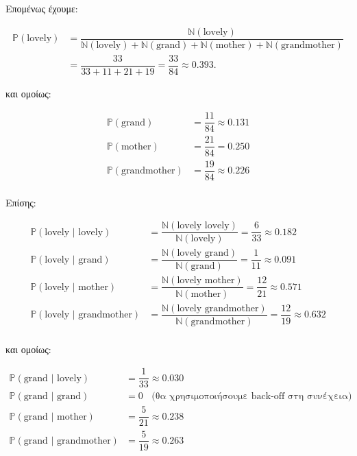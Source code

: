 \documentclass[12pt,a4paper]{article}
\begin{document}
			Επομένως έχουμε:
			
			\begin{align*}
				\mathbb{P}(\text{lovely}) &= \dfrac{\mathbb{N}(\text{lovely})}{\mathbb{N}(\text{lovely}) + \mathbb{N}(\text{grand}) + \mathbb{N}(\text{mother}) + \mathbb{N}(\text{grandmother})} \\ 
				&= \dfrac{33}{33+11+21+19} = \dfrac{33}{84} \approx 0.393.
			\end{align*}
			
			και ομοίως:
			
			\begin{align*}
				\mathbb{P}(\text{grand}) &= \dfrac{11}{84} \approx 0.131\\
				\mathbb{P}(\text{mother}) &= \dfrac{21}{84} = 0.250\\
				\mathbb{P}(\text{grandmother}) &= \dfrac{19}{84} \approx 0.226 \\
			\end{align*}
			
			Επίσης:
			
			\begin{align*}
				\mathbb{P}(\text{lovely | lovely}) &= \dfrac{\mathbb{N}(\text{lovely lovely})}{\mathbb{N}(\text{lovely})} = \dfrac{6}{33} \approx 0.182 \\
				\mathbb{P}(\text{lovely | grand}) &= \dfrac{\mathbb{N}(\text{lovely grand})}{\mathbb{N}(\text{grand})} = \dfrac{1}{11} \approx 0.091 \\
				\mathbb{P}(\text{lovely | mother}) &= \dfrac{\mathbb{N}(\text{lovely mother})}{\mathbb{N}(\text{mother})} = \dfrac{12}{21} \approx 0.571 \\
				\mathbb{P}(\text{lovely | grandmother}) &= \dfrac{\mathbb{N}(\text{lovely grandmother})}{\mathbb{N}(\text{grandmother})} = \dfrac{12}{19} \approx 0.632 \\
			\end{align*}
			
			και ομοίως:
			
			\begin{align*}
				\mathbb{P}(\text{grand | lovely}) &= \dfrac{1}{33} \approx 0.030 \\
				\mathbb{P}(\text{grand | grand}) &= 0 ~~~~\text{(θα χρησιμοποιήσουμε back-off στη συνέχεια)}\\
				\mathbb{P}(\text{grand | mother}) &= \dfrac{5}{21} \approx 0.238 \\
				\mathbb{P}(\text{grand | grandmother}) &= \dfrac{5}{19} \approx 0.263\\
			\end{align*}
			
\end{document}
